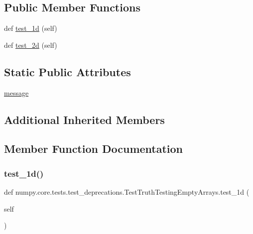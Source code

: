 \subsection*{Public Member Functions}
\begin{DoxyCompactItemize}
\item 
def \hyperlink{classnumpy_1_1core_1_1tests_1_1test__deprecations_1_1TestTruthTestingEmptyArrays_a143309600f828edc460c1ead97a80b41}{test\+\_\+1d} (self)
\item 
def \hyperlink{classnumpy_1_1core_1_1tests_1_1test__deprecations_1_1TestTruthTestingEmptyArrays_a9cf2cba1eb152c1e9cf5615e0b95f84a}{test\+\_\+2d} (self)
\end{DoxyCompactItemize}
\subsection*{Static Public Attributes}
\begin{DoxyCompactItemize}
\item 
\hyperlink{classnumpy_1_1core_1_1tests_1_1test__deprecations_1_1TestTruthTestingEmptyArrays_a90f2ac0f47fe8e5aa9e25208620bb7bf}{message}
\end{DoxyCompactItemize}
\subsection*{Additional Inherited Members}


\subsection{Member Function Documentation}
\mbox{\label{classnumpy_1_1core_1_1tests_1_1test__deprecations_1_1TestTruthTestingEmptyArrays_a143309600f828edc460c1ead97a80b41}} 
\subsubsection{\texorpdfstring{test\+\_\+1d()}{test\_1d()}}
{\footnotesize\ttfamily def numpy.\+core.\+tests.\+test\+\_\+deprecations.\+Test\+Truth\+Testing\+Empty\+Arrays.\+test\+\_\+1d (\begin{DoxyParamCaption}\item[{}]{self }\end{DoxyParamCaption})}

